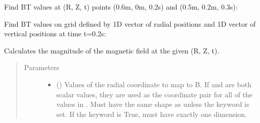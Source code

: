 \documentclass[letterpaper,10pt,english]{sphinxmanual}
\begin{document}
\begin{fulllineitems}
\begin{fulllineitems}
Find BT values at (R, Z, t) points (0.6m, 0m, 0.2s) and (0.5m, 0.2m, 0.3s):

\begin{sphinxVerbatim}[commandchars=\\\{\}]
  \PYG{p}{[} \PYG{p}{]} \PYG{p}{[} \PYG{p}{]} \PYG{p}{[} \PYG{p}{]} 
\end{sphinxVerbatim}

Find BT values on grid defined by 1D vector of radial positions 
and 1D vector of vertical positions  at time t=0.2s:

\begin{sphinxVerbatim}[commandchars=\\\{\}]
     
\end{sphinxVerbatim}

\end{fulllineitems}


\begin{fulllineitems}
\label{\detokenize{eqtools:eqtools.core.Equilibrium.rz2B}}
Calculates the magnitude of the magnetic field at the given (R, Z, t).
\begin{quote}\begin{description}
\item[{Parameters}] \leavevmode\begin{itemize}
\item {} 
 () \textendash{} Values of the radial coordinate to
map to B. If  and  are both scalar values, they are used
as the coordinate pair for all of the values in . Must have
the same shape as  unless the  keyword is set. If
the  keyword is True,  must have exactly one
dimension.


\end{itemize}
\end{description}
\end{quote}
\end{fulllineitems}
\end{fulllineitems}
\end{document}
